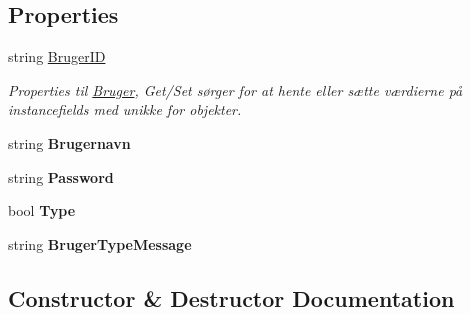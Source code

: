 \subsection*{Properties}
\begin{DoxyCompactItemize}
\item 
string \mbox{\hyperlink{class_r_f_storage_1_1_model_1_1_bruger_a70cdf87fdf00eaab8c4dcf9bd404758e}{Bruger\+ID}}
\begin{DoxyCompactList}\small\item\em Properties til \mbox{\hyperlink{class_r_f_storage_1_1_model_1_1_bruger}{Bruger}}, Get/\+Set sørger for at hente eller sætte værdierne på instancefields med unikke for objekter. \end{DoxyCompactList}\item 
\mbox{\label{class_r_f_storage_1_1_model_1_1_bruger_ab1bf869130b53828003e05a2145e07e8}} 
string {\bfseries Brugernavn}
\item 
\mbox{\label{class_r_f_storage_1_1_model_1_1_bruger_a66a501b60f0b126985621e58526e5c72}} 
string {\bfseries Password}
\item 
\mbox{\label{class_r_f_storage_1_1_model_1_1_bruger_ab7c752155f81dfec2320da9d5f9d7cfd}} 
bool {\bfseries Type}
\item 
\mbox{\label{class_r_f_storage_1_1_model_1_1_bruger_ab336c98f643af26bfd288369b233ac9c}} 
string {\bfseries Bruger\+Type\+Message}
\end{DoxyCompactItemize}


\subsection{Constructor \& Destructor Documentation}
\mbox{\label{class_r_f_storage_1_1_model_1_1_bruger_ad75e407d3a7660f2d9be2addf06b939e}} 
